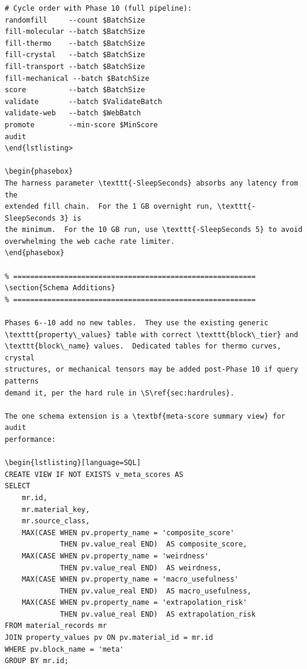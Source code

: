 \documentclass[11pt, a4paper]{article}
\begin{document}
\begin{lstlisting}[language={}]
# Cycle order with Phase 10 (full pipeline):
randomfill     --count $BatchSize
fill-molecular --batch $BatchSize
fill-thermo    --batch $BatchSize
fill-crystal   --batch $BatchSize
fill-transport --batch $BatchSize
fill-mechanical --batch $BatchSize
score          --batch $BatchSize
validate       --batch $ValidateBatch
validate-web   --batch $WebBatch
promote        --min-score $MinScore
audit
\end{lstlisting>

\begin{phasebox}
The harness parameter \texttt{-SleepSeconds} absorbs any latency from the
extended fill chain.  For the 1 GB overnight run, \texttt{-SleepSeconds 3} is
the minimum.  For the 10 GB run, use \texttt{-SleepSeconds 5} to avoid
overwhelming the web cache rate limiter.
\end{phasebox}

% =========================================================
\section{Schema Additions}
% =========================================================

Phases 6--10 add no new tables.  They use the existing generic
\texttt{property\_values} table with correct \texttt{block\_tier} and
\texttt{block\_name} values.  Dedicated tables for thermo curves, crystal
structures, or mechanical tensors may be added post-Phase 10 if query patterns
demand it, per the hard rule in \S\ref{sec:hardrules}.

The one schema extension is a \textbf{meta-score summary view} for audit
performance:

\begin{lstlisting}[language=SQL]
CREATE VIEW IF NOT EXISTS v_meta_scores AS
SELECT
	mr.id,
	mr.material_key,
	mr.source_class,
	MAX(CASE WHEN pv.property_name = 'composite_score'
			 THEN pv.value_real END)  AS composite_score,
	MAX(CASE WHEN pv.property_name = 'weirdness'
			 THEN pv.value_real END)  AS weirdness,
	MAX(CASE WHEN pv.property_name = 'macro_usefulness'
			 THEN pv.value_real END)  AS macro_usefulness,
	MAX(CASE WHEN pv.property_name = 'extrapolation_risk'
			 THEN pv.value_real END)  AS extrapolation_risk
FROM material_records mr
JOIN property_values pv ON pv.material_id = mr.id
WHERE pv.block_name = 'meta'
GROUP BY mr.id;
\end{lstlisting}
\end{document}
